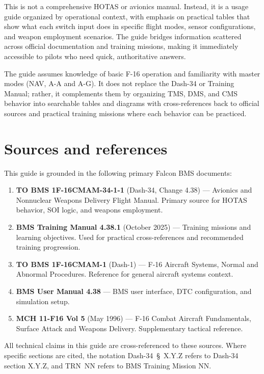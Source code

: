 \documentclass[11pt, a4paper, twoside]{report}
\newcommand{\dashref}[1]{Dash-34~\S~#1}
\newcommand{\trnref}[1]{TRN~#1}
\begin{document}
This is not a comprehensive HOTAS or avionics manual. Instead, it is a usage guide organized by operational context, with emphasis on practical tables that show what each switch input does in specific flight modes, sensor configurations, and weapon employment scenarios. The guide bridges information scattered across official documentation and training missions, making it immediately accessible to pilots who need quick, authoritative answers.

The guide assumes knowledge of basic F-16 operation and familiarity with master modes (NAV, A-A and A-G). It does not replace the Dash-34 or Training Manual; rather, it complements them by organizing TMS, DMS, and CMS behavior into searchable tables and diagrams with cross-references back to official sources and practical training missions where each behavior can be practiced.

\section{Sources and references}
\label{sec:C1-S2}

This guide is grounded in the following primary Falcon BMS documents:

\begin{enumerate}
	\item \textbf{TO BMS 1F-16CMAM-34-1-1} (Dash-34, Change 4.38) --- Avionics and Nonnuclear Weapons Delivery Flight Manual. Primary source for HOTAS behavior, SOI logic, and weapons employment.
	\item \textbf{BMS Training Manual 4.38.1} (October 2025) --- Training missions and learning objectives. Used for practical cross-references and recommended training progression.
	\item \textbf{TO BMS 1F-16CMAM-1} (Dash-1) --- F-16 Aircraft Systems, Normal and Abnormal Procedures. Reference for general aircraft systems context.
	\item \textbf{BMS User Manual 4.38} --- BMS user interface, DTC configuration, and simulation setup.
	\item \textbf{MCH 11-F16 Vol 5} (May 1996) --- F-16 Combat Aircraft Fundamentals, Surface Attack and Weapons Delivery. Supplementary tactical reference.
\end{enumerate}

All technical claims in this guide are cross-referenced to these sources. Where specific sections are cited, the notation \dashref{X.Y.Z} refers to Dash-34 section X.Y.Z, and \trnref{NN} refers to BMS Training Mission NN.
\end{document}
